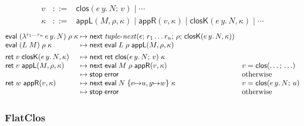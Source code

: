 \documentclass[10pt]{article}
\theoremstyle{acmplain}
\newcommand{\key}[1]{\mathsf{#1}}
\newcommand{\clos}[2]{\lambda^{#1}\, #2.\,}
\newcommand{\ev}[3]{\key{eval}\;#1\;#2\;#3}
\newcommand{\rt}[2]{\key{ret}\;#1\;#2}
\newcommand{\nxt}{\key{next}\;}
\newcommand{\stp}{\key{stop}\;}
\newcommand{\error}{\key{error}}
\newcommand{\closV}[2]{\key{clos}(#1;\, #2)}
\newcommand{\Kf}[2]{\key{#1}(#2)}
\newcommand{\tnext}{\mathit{tuple\text{-}next}}
\begin{document}
\[
\begin{array}{rcl}
  v &::=& \closV{e\, y.\, N}{v} \mid \cdots \\
  \kappa &::=& \Kf{appL}{M, \rho, \kappa} \mid \Kf{appR}{v, \kappa} \mid \Kf{closK}{e\, y.\, N, \kappa} \mid \cdots
\end{array}
\]
\[
\begin{array}{@{}l@{\;\mapsto\;}l@{\quad}l@{}}
  \ev{(\clos{r_1 \ldots r_n}{e\, y} N)}{\rho}{\kappa} &
    \nxt \tnext(\epsilon;\, r_1 \ldots r_n;\, \rho;\, \Kf{closK}{e\, y.\, N, \kappa}) \\
  \ev{(L\;M)}{\rho}{\kappa} & \nxt \ev{L}{\rho}{\Kf{appL}{M, \rho, \kappa}} \\[1ex]
  \rt{v}{\Kf{closK}{e\, y.\, N, \kappa}} & \nxt \rt{\closV{e\, y.\, N}{v}}{\kappa} \\
  \rt{v}{\Kf{appL}{M, \rho, \kappa}} & \nxt \ev{M}{\rho}{\Kf{appR}{v, \kappa}} & v = \closV{\ldots}{\ldots} \\
  & \stp \error & \text{otherwise} \\
  \rt{w}{\Kf{appR}{v, \kappa}} & \nxt \ev{N}{\{e {\mapsto} u, y {\mapsto} w\}}{\kappa}
    & v = \closV{e\, y.\, N}{u} \\
  & \stp \error & \text{otherwise}
\end{array}
\]

\subsubsection{FlatClos}
\end{document}
